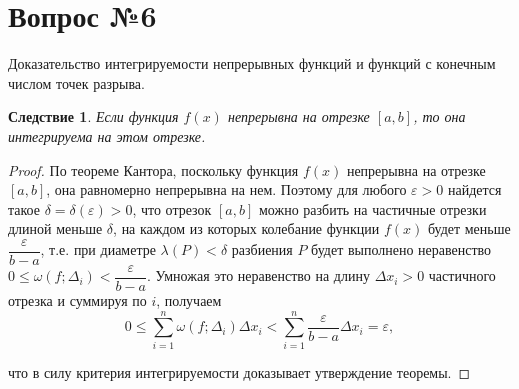 \documentclass[12pt]{report}
\numberwithin{equation}{section}
\newtheorem{remark}{Следствие}[section]
\begin{document}
\newpage \section{Вопрос №6} %
\begin{framed}
Доказательство интегрируемости непрерывных функций и функций с конечным числом
точек разрыва.
\end{framed}
\begin{remark}Если функция $f(x)$ непрерывна на отрезке $[a,b]$, то она интегрируема на этом отрезке.
\end{remark}
\begin{proof}
По теореме Кантора, поскольку функция $f(x)$ непрерывна на отрезке $[a,b]$, она равномерно непрерывна на нем. Поэтому для любого $\varepsilon > 0$ найдется такое $\delta = \delta(\varepsilon) > 0$, что отрезок $[a,b]$ можно разбить на частичные отрезки длиной меньше $\delta$, на каждом из которых колебание функции $f(x)$ будет меньше $\dfrac{\varepsilon}{b - a}$, т.е. при диаметре $\lambda(P) < \delta$ разбиения $P$ будет выполнено неравенство $0 \leqslant \omega(f; \Delta_i) < \dfrac{\varepsilon}{b-a}$. Умножая это неравенство на длину $\Delta x_i > 0$  частичного отрезка и суммируя по $i$, получаем
\[ 0 \leqslant \sum_{i = 1}^n \omega(f; \Delta_i) \Delta x_i < \sum_{i = 1}^n \frac{\varepsilon}{b-a} \Delta x_i = \varepsilon,\]

что в силу критерия интегрируемости доказывает утверждение теоремы.
\end{proof}
\end{document}
